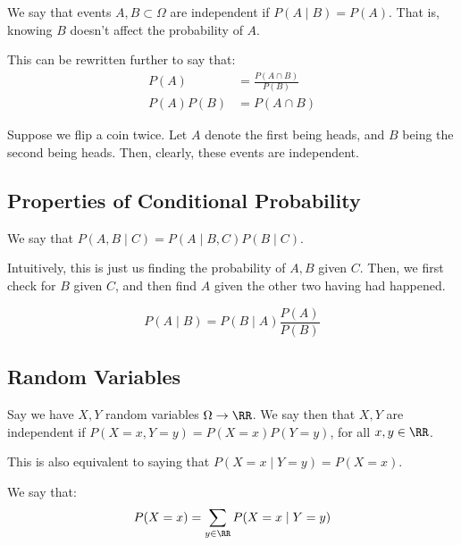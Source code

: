 \documentclass[openany]{book}
\begin{document}
\begin{defn}[Independence]
	We say that events $A, B \subset \Omega$ are independent if $P(A \mid B) = P(A)$. That is, knowing $B$ doesn't affect the probability of $A$.
	
	This can be rewritten further to say that:
	\begin{align*}
		P(A) &= \frac{P(A \cap B)}{P(B)} \\
		P(A)P(B) &= P(A \cap B)
	\end{align*}
\end{defn}

\begin{example}
	Suppose we flip a coin twice. Let $A$ denote the first being heads, and $B$ being the second being heads. Then, clearly, these events are independent.
\end{example}

\subsection{Properties of Conditional Probability}
\begin{thm}
	We say that $P(A, B \mid C) = P(A \mid B, C) P(B \mid C)$.
\end{thm}
Intuitively, this is just us finding the probability of $A, B$ given $C$. Then, we first check for $B$ given $C$, and then find $A$ given the other two having had happened.

\begin{thm}
	\begin{equation*}
		P(A \mid B) = P(B \mid A) \frac{P(A)}{P(B)}
	\end{equation*}
\end{thm}

\subsection{Random Variables}
Say we have $X, Y$ random variables $\Omega \rightarrow \RR$. We say then that $X, Y$ are independent if $P(X = x, Y = y) = P(X=x) P(Y=y)$, for all $x, y \in \RR$.

This is also equivalent to saying that $P(X = x \mid Y = y) = P(X = x)$.

\begin{thm}
	We say that:
	\begin{equation*}
		P(X = x) = \sum_{y \in \RR} P(X = x \mid Y = y)
	\end{equation*}
\end{thm}
\end{document}
